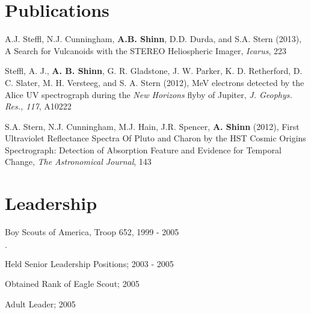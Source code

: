 \documentclass[margin,line]{res}
\newenvironment{list2}{
  \begin{list}{$\cdot$}{%
      \setlength{\itemsep}{0in}
      \setlength{\parsep}{0in} \setlength{\parskip}{0in}
      \setlength{\topsep}{0in} \setlength{\partopsep}{0in} 
      \setlength{\leftmargin}{0.2in}}}{\end{list}}
\begin{document}
\begin{resume}
\section{\sc Publications}

A.J. Steffl, N.J. Cunningham, {\bf A.B. Shinn}, D.D. Durda, and S.A. Stern (2013), A Search for Vulcanoids with the STEREO Heliospheric Imager, {\em Icarus}, 223

Steffl, A. J., {\bf A. B. Shinn}, G. R. Gladstone, J. W. Parker, K. D. Retherford, D. C. Slater, M. H. Versteeg, and S. A. Stern (2012), MeV electrons detected by the Alice UV spectrograph during the {\em New Horizons} flyby of Jupiter, {\em J. Geophys. Res., 117}, A10222%

S.A. Stern, N.J. Cunningham, M.J. Hain, J.R. Spencer, {\bf A. Shinn} (2012), First Ultraviolet Reflectance Spectra Of Pluto and Charon by the HST Cosmic Origins Spectrograph: Detection of Absorption Feature and Evidence for Temporal Change, {\em The Astronomical Journal}, 143


% 
% 
% 
% 
% 
% 


\section{\sc Leadership}

Boy Scouts of America, Troop 652, 1999 - 2005
\begin{list2}
\item Held Senior Leadership Positions; 2003 - 2005
\item Obtained Rank of Eagle Scout; 2005
\item Adult Leader; 2005
\end{list2}


\end{resume}
\end{document}
